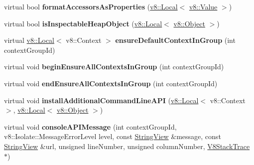 \begin{DoxyCompactItemize}
\item 
\mbox{\label{classv8__inspector_1_1V8InspectorClient_ae9d50c9ea6716879281ca401fbe8114a}} 
virtual bool {\bfseries format\+Accessors\+As\+Properties} (\mbox{\hyperlink{classv8_1_1Local}{v8\+::\+Local}}$<$ \mbox{\hyperlink{classv8_1_1Value}{v8\+::\+Value}} $>$)
\item 
\mbox{\label{classv8__inspector_1_1V8InspectorClient_a0871bb7e065494f174e445845b56f30c}} 
virtual bool {\bfseries is\+Inspectable\+Heap\+Object} (\mbox{\hyperlink{classv8_1_1Local}{v8\+::\+Local}}$<$ \mbox{\hyperlink{classv8_1_1Object}{v8\+::\+Object}} $>$)
\item 
\mbox{\label{classv8__inspector_1_1V8InspectorClient_a8b47c57ccc57f386570e1148a2efe38a}} 
virtual \mbox{\hyperlink{classv8_1_1Local}{v8\+::\+Local}}$<$ v8\+::\+Context $>$ {\bfseries ensure\+Default\+Context\+In\+Group} (int context\+Group\+Id)
\item 
\mbox{\label{classv8__inspector_1_1V8InspectorClient_a004987bc7b929f12a39d3e1cc7804a05}} 
virtual void {\bfseries begin\+Ensure\+All\+Contexts\+In\+Group} (int context\+Group\+Id)
\item 
\mbox{\label{classv8__inspector_1_1V8InspectorClient_affc437fd3eb8e2294b1e9d6ad8bf8dad}} 
virtual void {\bfseries end\+Ensure\+All\+Contexts\+In\+Group} (int context\+Group\+Id)
\item 
\mbox{\label{classv8__inspector_1_1V8InspectorClient_acbc688fd17d8c8a29435c4533f9e1f43}} 
virtual void {\bfseries install\+Additional\+Command\+Line\+A\+PI} (\mbox{\hyperlink{classv8_1_1Local}{v8\+::\+Local}}$<$ v8\+::\+Context $>$, \mbox{\hyperlink{classv8_1_1Local}{v8\+::\+Local}}$<$ \mbox{\hyperlink{classv8_1_1Object}{v8\+::\+Object}} $>$)
\item 
\mbox{\label{classv8__inspector_1_1V8InspectorClient_acac454b61131fecf04f5d7631ddeae86}} 
virtual void {\bfseries console\+A\+P\+I\+Message} (int context\+Group\+Id, v8\+::\+Isolate\+::\+Message\+Error\+Level level, const \mbox{\hyperlink{classv8__inspector_1_1StringView}{String\+View}} \&message, const \mbox{\hyperlink{classv8__inspector_1_1StringView}{String\+View}} \&url, unsigned line\+Number, unsigned column\+Number, \mbox{\hyperlink{classv8__inspector_1_1V8StackTrace}{V8\+Stack\+Trace}} $\ast$)

\end{DoxyCompactItemize}
